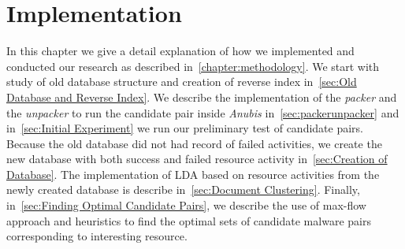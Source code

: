 \chapter{Implementation}\label{chapter:implementation}
In this chapter we give a detail explanation of how we implemented and conducted our research as described in~\autoref{chapter:methodology}.
We start with study of old database structure and creation of reverse index in~\autoref{sec:Old Database and Reverse Index}.
We describe the implementation of the \emph{packer} and the \emph{unpacker} to run the candidate pair inside \emph{Anubis} in~\autoref{sec:packerunpacker} and in~\autoref{sec:Initial Experiment} we run our preliminary test of candidate pairs.
Because the old database did not had record of failed activities, we create the new database with both success and failed resource activity in~\autoref{sec:Creation of Database}.
The implementation of LDA based on resource activities from the newly created database is describe in~\autoref{sec:Document Clustering}.
Finally, in~\autoref{sec:Finding Optimal Candidate Pairs}, we describe the use of max-flow approach and heuristics to find the optimal sets of candidate malware pairs corresponding to interesting resource.

